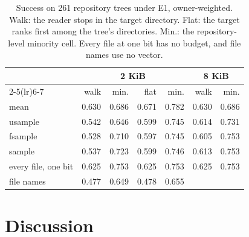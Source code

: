 \documentclass[sigconf,natbib=true,anonymous=true]{acmart}
\begin{document}
\begin{table}[t]
\caption{Success on 261 repository trees under E1, owner-weighted. Walk: the reader stops in the target directory. Flat: the target ranks first among the tree's directories. Min.: the repository-level minority cell. Every file at one bit has no budget, and file names use no vector.}
\label{tab:tree}
\setlength{\tabcolsep}{3.4pt}
\small
\begin{tabular}{lrrrrrr}
\toprule
& \multicolumn{4}{c}{2 KiB} & \multicolumn{2}{c}{8 KiB} \\
\cmidrule(lr){2-5}\cmidrule(lr){6-7}
& walk & min. & flat & min. & walk & min. \\
\midrule
mean & 0.630 & 0.686 & 0.671 & 0.782 & 0.630 & 0.686 \\
usample & 0.542 & 0.646 & 0.599 & 0.745 & 0.614 & 0.731 \\
fsample & 0.528 & 0.710 & 0.597 & 0.745 & 0.605 & 0.753 \\
sample & 0.537 & 0.723 & 0.599 & 0.746 & 0.613 & 0.753 \\
every file, one bit & 0.625 & 0.753 & 0.625 & 0.753 & 0.625 & 0.753 \\
file names & 0.477 & 0.649 & 0.478 & 0.655 & & \\
\bottomrule
\end{tabular}
\end{table}

\section{Discussion}
\end{document}
